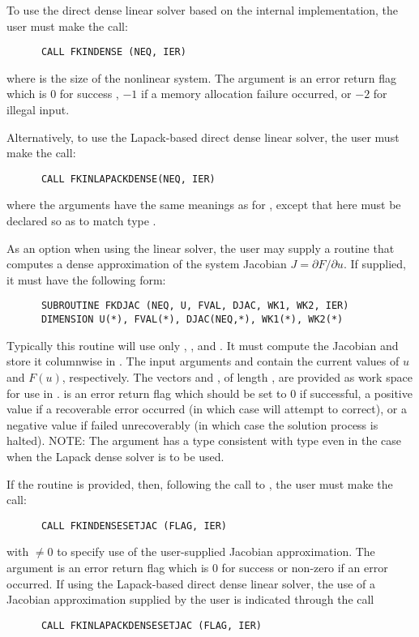 \begin{Steps}
  To use the direct dense linear solver based on the internal {\kinsol}
  implementation, the user must make the call:
\begin{verbatim}
      CALL FKINDENSE (NEQ, IER)
\end{verbatim}
  where  is the size of the nonlinear system.
  The argument  is an error return flag which is $0$ for success , 
  $-1$ if a memory allocation failure occurred, or $-2$ for illegal input.

  Alternatively, to use the Lapack-based direct dense linear solver, 
  the user must make the call:
\begin{verbatim}
      CALL FKINLAPACKDENSE(NEQ, IER)
\end{verbatim}
  where the arguments have the same meanings as for , except
  that here  must be declared so as to match {\C} type .

  As an option when using the {\dense} linear solver, the user may supply a
  routine that computes a dense approximation of the system Jacobian 
  $J = \partial F / \partial u$. If supplied, it must have the following form:
\begin{verbatim}
      SUBROUTINE FKDJAC (NEQ, U, FVAL, DJAC, WK1, WK2, IER)
      DIMENSION U(*), FVAL(*), DJAC(NEQ,*), WK1(*), WK2(*)
\end{verbatim}
  Typically this routine will use only , , and . 
  It must compute the Jacobian and store it columnwise in .
  The input arguments  and  contain the current
  values of $u$ and $F(u)$, respectively.
  The vectors  and ,
  of length , are provided as work space for use in .
   is an error return flag which should be set to $0$ if successful,
  a positive value if a recoverable error occurred (in which case {\kinsol}
  will attempt to correct), or a negative value if  failed
  unrecoverably (in which case the solution process is halted).
  NOTE: The argument  has a type consistent with {\C} type 
  even in the case when the Lapack dense solver is to be used.

  If the  routine is provided, then, 
  following the call to , the user must make the call:
\begin{verbatim}
      CALL FKINDENSESETJAC (FLAG, IER)
\end{verbatim}
  with  $\neq 0$ to specify use of the user-supplied Jacobian
  approximation.  The argument  is an error return flag which is $0$ 
  for success or non-zero if an error occurred.
  If using the Lapack-based direct dense linear solver, the use of a
  Jacobian approximation supplied by the user is indicated through the call
\begin{verbatim}
      CALL FKINLAPACKDENSESETJAC (FLAG, IER)
\end{verbatim}


\end{Steps}
